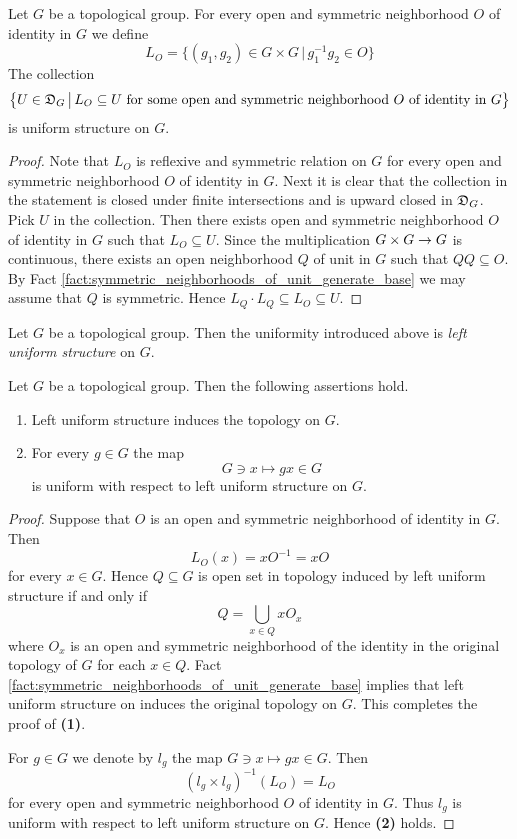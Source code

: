 \documentclass[10pt]{amsart}
\begin{document}
\begin{fact}\label{fact:left_uniform_structure_on_topological_group}
	Let $G$ be a topological group. For every open and symmetric neighborhood $O$ of identity in $G$ we define
	$$L_O = \big\{(g_1,g_2)\in G\times G\,\big|\,g_1^{-1}g_2 \in O\big\}$$
	The collection
	$$\big\{U \in {\mathfrak D}_G\,\big|\,L_O\subseteq U\mbox{ for some open and symmetric neighborhood }O\mbox{ of identity in }G\big\}$$
	is uniform structure on $G$.
\end{fact}
\begin{proof}
	Note that $L_O$ is reflexive and symmetric relation on $G$ for every open and symmetric neighborhood $O$ of identity in $G$. Next it is clear that the collection in the statement is closed under finite intersections and is upward closed in ${\mathfrak D}_G$. Pick $U$ in the collection. Then there exists open and symmetric neighborhood $O$ of identity in $G$ such that $L_O\subseteq U$. Since the multiplication $G\times G\rightarrow G$ is continuous, there exists an open neighborhood $Q$ of unit in $G$ such that $QQ \subseteq O$. By Fact \ref{fact:symmetric_neighborhoods_of_unit_generate_base} we may assume that $Q$ is symmetric. Hence $L_Q\cdot L_Q \subseteq L_O\subseteq U$.
\end{proof}

\begin{definition}
	Let $G$ be a topological group. Then the uniformity introduced above is \textit{left uniform structure} on $G$.
\end{definition}

\begin{proposition}\label{proposition:left_uniform_structure_on_topological_group}
	Let $G$ be a topological group. Then the following assertions hold.
	\begin{enumerate}[label=\emph{\textbf{(\arabic*)}}, leftmargin=3.0em]
		\item Left uniform structure induces the topology on $G$.
		\item For every $g \in G$ the map
		      $$G\ni x \mapsto gx \in G$$
		      is uniform with respect to left uniform structure on $G$.
	\end{enumerate}
\end{proposition}
\begin{proof}
	Suppose that $O$ is an open and symmetric neighborhood of identity in $G$. Then
	$$L_O(x) = xO^{-1} = xO$$
	for every $x \in G$. Hence $Q \subseteq G$ is open set in topology induced by left uniform structure if and only if
	$$Q = \bigcup_{x\in Q}xO_x$$
	where $O_x$ is an open and symmetric neighborhood of the identity in the original topology of $G$ for each $x \in Q$. Fact \ref{fact:symmetric_neighborhoods_of_unit_generate_base} implies that left uniform structure on induces the original topology on $G$. This completes the proof of \textbf{(1)}.

	For $g \in G$ we denote by $l_g$ the map $G \ni x \mapsto gx \in G$. Then
	$$\left(l_g\times l_g\right)^{-1}(L_O) = L_O$$
	for every open and symmetric neighborhood $O$ of identity in $G$. Thus $l_g$ is uniform with respect to left uniform structure on $G$. Hence \textbf{(2)} holds.
\end{proof}
\end{document}
